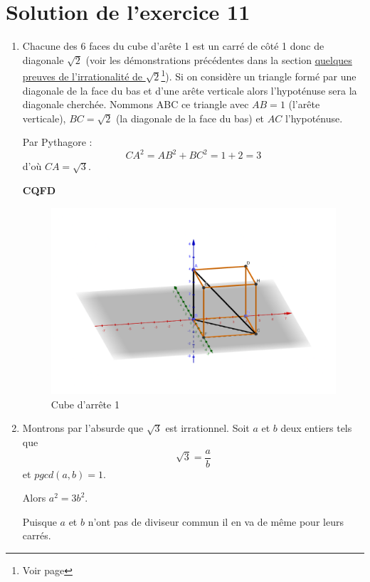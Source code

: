 \documentclass[a4paper,11pt]{book}
\begin{document}
\clearpage

\section{Solution de l'exercice 11}
\label{sec:orgf6f2e0c}
\label{orgc0eae64}
\label{page:sec8.6.2sol11}

\begin{enumerate}
\item Chacune des 6 faces du cube d'arête 1 est un carré de côté 1 donc
de diagonale \(\sqrt{2}\) (voir les démonstrations précédentes dans
la section \hyperref[orgea5a5bb]{quelques preuves de l'irrationalité de
\(\sqrt{2}\)}\footnote{Voir page \pageref{page:sqrt2proofs}}).
Si on considère un triangle formé par une diagonale de la face du
bas et d'une arête verticale alors l'hypoténuse sera la diagonale
cherchée. Nommons ABC ce triangle avec \(AB = 1\) (l'arête
verticale), \(BC = \sqrt{2}\) (la diagonale de la face du bas) et
\(AC\) l'hypoténuse.

Par Pythagore :
\[CA^2 = AB^2 + BC^2 = 1 + 2 = 3\]
d'où \(CA = \sqrt{3}\).

\textbf{CQFD}
\begin{figure}[htbp]
\centering
\includegraphics[width=.9\linewidth]{./manip_real/img/cube-sqrt3-png.png}
\caption{Cube d'arrête 1}
\end{figure}
\item Montrons par l'absurde que \(\sqrt{3}\)
est irrationnel.
Soit \(a\) et \(b\) deux entiers tels que
\[\sqrt{3} = \dfrac{a}{b}\]
et \(pgcd(a, b) = 1\).

Alors \(a^2 = 3b^2\).

Puisque \(a\) et \(b\) n'ont pas de diviseur commun il en va de
même pour leurs carrés.


\end{enumerate}
\end{document}
